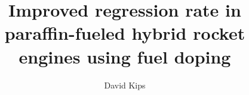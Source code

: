 \documentclass[]{article}
\title{Improved regression rate in paraffin-fueled hybrid rocket engines using fuel doping}
\author{David Kips}
\begin{document}
\maketitle

\begin{abstract}

\end{abstract}


\end{document}
